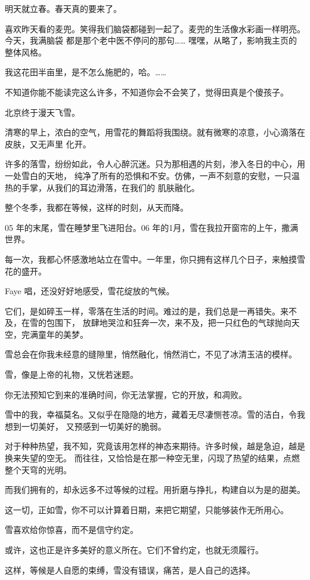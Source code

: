 		明天就立春。春天真的要来了。


		喜欢昨天看的麦兜。笑得我们脑袋都碰到一起了。麦兜的生活像水彩画一样明亮。今天，我满脑袋
	都是那个老中医不停问的那句…… 嘿嘿，从略了，影响我主页的整体风格。

		我这花田半亩里，是不怎么施肥的，哈。……

		不知道你能不能读完这么许多，不知道你会不会笑了，觉得田真是个傻孩子。

	\endwriting



		北京终于漫天飞雪。

		清寒的早上，浓白的空气，用雪花的舞蹈将我围绕。就有微寒的凉意，小心滴落在皮肤，又无声里
	化开。

		许多的落雪，纷纷如此，令人心醉沉迷。只为那相遇的片刻，渗入冬日的中心，用一处雪白的天地，
	纯净了所有的恐惧和不安。仿佛，一声不刻意的安慰，一只温热的手掌，从我们的耳边滑落，在我们的
	肌肤融化。

		整个冬季，我都在等候，这样的时刻，从天而降。

		05 年的末尾，雪在睡梦里飞进阳台。06 年的1月，雪在我拉开窗帘的上午，撒满世界。

		每一次，我都心怀感激地站立在雪中。一年里，你只拥有这样几个日子，来触摸雪花的盛开。

		Faye 唱，还没好好地感受，雪花绽放的气候。

		它们，是如碎玉一样，零落在生活的时间。难过的是，我们总是一再错失。来不及，在雪的包围下，
	放肆地哭泣和狂奔一次，来不及，把一只红色的气球抛向天空，完满童年的美梦。

		雪总会在你我未经意的缝隙里，悄然融化，悄然消亡，不见了冰清玉洁的模样。

		雪，像是上帝的礼物，又恍若迷题。

		你无法预知它到来的准确时间，你无法掌握，它的开放，和凋败。

		雪中的我，幸福莫名。又似乎在隐隐的地方，藏着无尽凄恻苍凉。雪的洁白，令我想到一切美好，
	又预感到一切美好的脆弱。

		对于种种热望，我不知，究竟该用怎样的神态来期待。许多时候，越是急迫，越是换来失望的空无。
	而往往，又恰恰是在那一种空无里，闪现了热望的结果，点燃整个天穹的光明。

		而我们拥有的，却永远多不过等候的过程。用折磨与挣扎，构建自以为是的甜美。

		这一切，正如雪，你不可以计算着日期，来把它期望，只能够装作无所用心。\par
		雪喜欢给你惊喜，而不是信守约定。\par
		或许，这也正是许多美好的意义所在。它们不曾约定，也就无须履行。\par
		这样，等候是人自愿的束缚，雪没有错误，痛苦，是人自己的选择。

